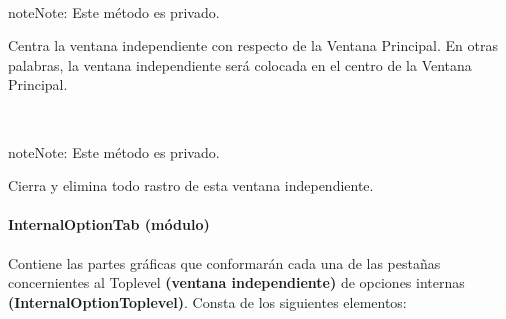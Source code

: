 \documentclass[class=report, crop=false]{standalone}
\begin{document}
\begin{fulllineitems}
\begin{fulllineitems}

~
\begin{notice}{note}{Note:}
Este método es privado.
\end{notice}

Centra la ventana independiente con respecto de la 
Ventana Principal.\break
En otras palabras, la ventana independiente será colocada 
en el centro de la Ventana Principal.

\end{fulllineitems}

\begin{fulllineitems}

~

\begin{notice}{note}{Note:}
Este método es privado.
\end{notice}

Cierra y elimina todo rastro de esta 
ventana independiente.

\end{fulllineitems}

\end{fulllineitems}

\paragraph{InternalOptionTab (módulo)}
\label{sec:a_3_3_2_3}
\begin{fulllineitems}
\begin{DUlineblock}{0em}
\item[] Contiene las partes gráficas que conformarán cada una de las pestañas
concernientes al Toplevel \textbf{(ventana independiente)} de opciones internas
\textbf{(InternalOptionToplevel)}.\break
Consta de los siguientes elementos:
\end{DUlineblock}
\end{fulllineitems}
\end{document}
